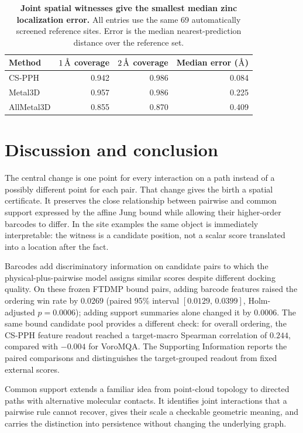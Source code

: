 \documentclass[11pt]{article}
\newcommand{\angstrom}{\ensuremath{\text{\normalfont\AA}}}
\begin{document}
\begin{table}[htbp]
\centering
\caption{\textbf{Joint spatial witnesses give the smallest median zinc localization error.} All entries use the same 69 automatically screened reference sites. Error is the median nearest-prediction distance over the reference set.}
\label{tab:external-zn}
\begin{tabular}{@{}lrrr@{}}
\toprule
Method & $1\,\angstrom$ coverage & $2\,\angstrom$ coverage & Median error (\angstrom) \\
\midrule
CS-PPH & 0.942 & 0.986 & 0.084 \\
Metal3D & 0.957 & 0.986 & 0.225 \\
AllMetal3D & 0.855 & 0.870 & 0.409 \\
\bottomrule
\end{tabular}
\end{table}

\section{Discussion and conclusion}

The central change is one point for every interaction on a path instead of a possibly different point for each pair. That change gives the birth a spatial certificate. It preserves the close relationship between pairwise and common support expressed by the affine Jung bound while allowing their higher-order barcodes to differ. In the site examples the same object is immediately interpretable: the witness is a candidate position, not a scalar score translated into a location after the fact.

Barcodes add discriminatory information on candidate pairs to which the physical-plus-pairwise model assigns similar scores despite different docking quality. On these frozen FTDMP bound pairs, adding barcode features raised the ordering win rate by $0.0269$ (paired 95\% interval $[0.0129,\,0.0399]$, Holm-adjusted $p=0.0006$); adding support summaries alone changed it by $0.0006$. The same bound candidate pool provides a different check: for overall ordering, the CS-PPH feature readout reached a target-macro Spearman correlation of $0.244$, compared with $-0.004$ for VoroMQA\citep{voromqa}. The Supporting Information reports the paired comparisons and distinguishes the target-grouped readout from fixed external scores.

Common support extends a familiar idea from point-cloud topology to directed paths with alternative molecular contacts. It identifies joint interactions that a pairwise rule cannot recover, gives their scale a checkable geometric meaning, and carries the distinction into persistence without changing the underlying graph.
\end{document}
